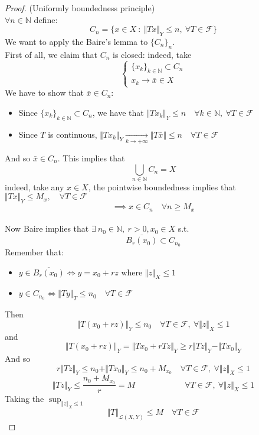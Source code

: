 \begin{proof} (Uniformly boundedness principle)\\
$\forall n\in \mathbb N$ define:
$$C_n=\{x\in X\ :\ \Vert Tx\Vert_Y\leq n, \ \forall T\in \mathcal F\}$$
We want to apply the Baire's lemma to $\{C_n\}_n$.\\
First of all, we claim that $C_n$ is closed: indeed, take
$$\begin{cases}
    \{ x_k\}_{k\in \mathbb N}\subset C_n\\ x_k\to \bar x\in X
\end{cases}$$
We have to show that $\bar x\in C_n$:
\begin{itemize}
    \item Since $\{ x_k\}_{k\in \mathbb N}\subset C_n$, we have that $\Vert Tx_k\Vert_Y\leq n\quad \forall k\in \mathbb N,\ \forall T\in \mathcal F$
    \item Since $T$ is continuous, $\Vert Tx_k\Vert_Y\xrightarrow[k\to+\infty]{} \Vert T\bar x\Vert\leq n\quad \forall T\in \mathcal F$
\end{itemize}
And so $\bar x\in C_n$. This implies that
$$\bigcup_{n\in \mathbb N} C_n=X$$
indeed, take any $x\in X$, the pointwise boundedness implies that $\Vert Tx\Vert_Y\leq M_x,\quad \forall T\in \mathcal F$
$$\implies x\in C_n\quad \forall n\geq M_x$$
\\
Now Baire implies that $\exists\  n_0\in \mathbb N, \ r>0, x_0\in X$ s.t.
$$\overline{B_r(x_0)}\subset C_{n_0}$$
Remember that:
\begin{itemize}
    \item $y\in \overline{B_r(x_0)} \iff y=x_0+rz$ where $\Vert z\Vert_X\leq 1$
    \item $y\in C_{n_0}\iff \Vert Ty\Vert_T\leq n_0\quad \forall T\in \mathcal F$
\end{itemize}
Then $$\Vert T(x_0+rz)\Vert_Y\leq n_0\quad \forall T\in \mathcal F, \ \forall \Vert z\Vert_X \leq 1$$
and
$$\Vert T(x_0+rz)\Vert_Y=\Vert Tx_0+rTz\Vert_Y\geq r\Vert Tz\Vert_Y-\Vert Tx_0\Vert_Y$$
And so $$r\Vert Tz\Vert_Y\leq n_0+\Vert Tx_0\Vert_Y\leq n_0+M_{x_0}\quad \forall T\in \mathcal F,\ \forall \Vert z\Vert_X \leq 1$$
$$\Vert Tz\Vert_Y\leq \frac{n_0+M_{x_0}}{r}=M\quad \quad \quad\quad\quad\quad\forall T\in \mathcal F,\ \forall \Vert z\Vert_X \leq 1$$
Taking the $\sup_{\Vert z\Vert_X\leq 1}$
$$\Vert T\Vert_{\mathcal L(X,Y)}\leq M\quad \forall T\in \mathcal F$$
\end{proof}

